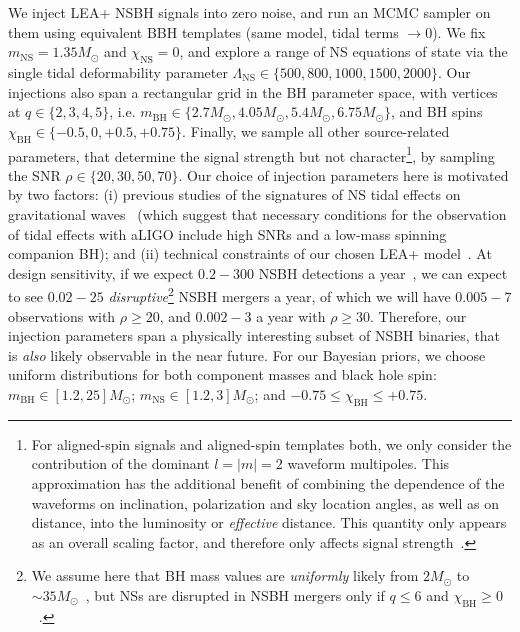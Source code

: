 \documentclass[aps,prd,amsmath,floats,floatfix, twocolumn,
superscriptaddress,nofootinbib,showpacs]{revtex4-1}
\newcommand{\lambdans}{\Lambda_\mathrm{NS}}
\newcommand{\chibh}{\chi_\mathrm{BH}}
\newcommand{\chins}{\chi_\mathrm{NS}}
\newcommand{\mbh}{m_\mathrm{BH}}
\newcommand{\mns}{m_\mathrm{NS}}
\begin{document}
We inject LEA+ NSBH signals into zero noise, and run an MCMC sampler on
them using equivalent BBH templates (same model, tidal terms $\rightarrow 0$).
We fix $\mns=1.35M_\odot$ and $\chins=0$, and explore a range of NS
equations of state via the single tidal deformability parameter
$\lambdans\in\{500, 800, 1000, 1500, 2000\}$. Our injections also span a
rectangular grid in the BH parameter space, with vertices at
$q\in\{2,3,4,5\}$, i.e.
$\mbh\in\{2.7M_\odot, 4.05M_\odot, 5.4M_\odot, 6.75M_\odot\}$, and BH spins
$\chibh\in\{-0.5, 0, +0.5, +0.75\}$. 
Finally, we sample all other source-related parameters, that determine the
signal strength but not character\footnote{For aligned-spin signals and
aligned-spin templates both, we only consider the contribution of the dominant
$l=|m|=2$ waveform multipoles. This approximation has the additional benefit
of combining the dependence of the waveforms on inclination, polarization
and sky location angles, as well as on distance, into the luminosity
or {\it effective} distance. This quantity only appears as an overall scaling
factor, and therefore only affects signal strength~\cite{Sathyaprakash:2009xs}.
}, by sampling the SNR $\rho\in\{20,30,50,70\}$. Our choice of injection
parameters here
is motivated by two factors: (i) previous studies of the signatures of NS tidal
effects on gravitational waves~\cite{FoucartEtAl:2011,Foucart:2013psa,
Foucart:2014nda} (which suggest that necessary conditions for the observation
of tidal effects with aLIGO include high SNRs and a low-mass spinning companion
BH); and (ii) technical constraints of our chosen LEA+ model~\cite{Lackey:2013axa}.
At design sensitivity, if we expect $0.2-300$ NSBH detections a 
year~\cite{Abadie:2010cfa}, we can expect to see $0.02-25$ 
{\it disruptive}\footnote{We assume here that BH mass values are {\it uniformly}
likely from $2M_\odot$ to $\sim 35M_\odot$~\cite{LIGOVirgo2016a}, but NSs are
disrupted in NSBH mergers only if $q\leq 6$ and $\chibh\geq 0$~\cite{Foucart:2014nda,
Foucart:2013psa}.
} NSBH mergers a year, of which we will have $0.005-7$ observations with 
$\rho\geq 20$, and $0.002-3$ a year with $\rho\geq 30$.
Therefore, our injection parameters span a physically interesting subset of NSBH
binaries, that is {\it also} likely observable in the near future. 
For our Bayesian priors, we choose uniform distributions for both component
masses and black hole spin: $\mbh\in[1.2,25]M_\odot$; $\mns\in[1.2,3]M_\odot$;
and $-0.75\leq \chibh\leq +0.75$.
\end{document}
